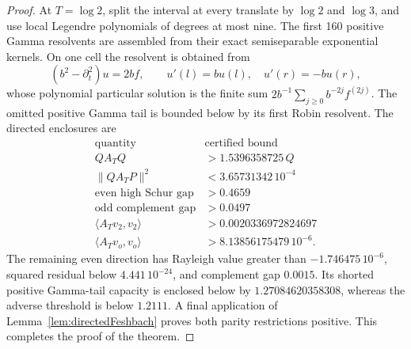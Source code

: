 \documentclass[11pt]{amsart}
\theoremstyle{definition}
\theoremstyle{remark}
\begin{document}
\begin{proof}
At \(T=\log2\), split the interval at every translate by \(\log2\) and
\(\log3\), and use local Legendre polynomials of degrees at most nine.
The first 160 positive Gamma resolvents are assembled from their exact
semiseparable exponential kernels.  On one cell the resolvent is obtained
from
\[
 (b^2-\partial_t^2)u=2bf,\qquad
 u'(l)=bu(l),\quad u'(r)=-bu(r),
\]
whose polynomial particular solution is the finite sum
\(2b^{-1}\sum_{j\ge0}b^{-2j}f^{(2j)}\).  The omitted positive Gamma tail is
bounded below by its first Robin resolvent.  The directed enclosures are
\[
\begin{array}{c|c}
\text{quantity}&\text{certified bound}\\ \hline
 QA_TQ&>1.5396358725\,Q\\
 \|QA_TP\|^2&<3.65731342\,10^{-4}\\
 \text{even high Schur gap}&>0.4659\\
 \text{odd complement gap}&>0.0497\\
 \langle A_Tv_2,v_2\rangle&>0.0020336972824697\\
 \langle A_Tv_o,v_o\rangle&>8.13856175479\,10^{-6}.
\end{array}
\]
The remaining even direction has Rayleigh value greater than
\(-1.746475\,10^{-6}\), squared residual below
\(4.441\,10^{-24}\), and complement gap \(0.0015\).  Its shorted positive
Gamma-tail capacity is enclosed below by \(1.27084620358308\), whereas the
adverse threshold is below \(1.2111\).  A final application of
Lemma~\ref{lem:directedFeshbach} proves both parity restrictions positive.
This completes the proof of the theorem.
\end{proof}
\end{document}
